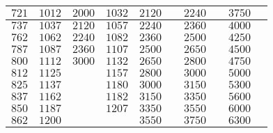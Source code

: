 \begin{table}[]
\begin{tabular}{|c|c|c|c|c|c|c|c|c|c|}
$721$       & $1012$       & $2000$      & $1032$      & $2120$      &           & $2240$            &                 & $3750$            &                 \\ \hline
$737$       & $1037$       & $2120$      & $1057$      & $2240$      &           & $2360$            &                 & $4000$            &                 \\ \hline
$762$       & $1062$       & $2240$      & $1082$      & $2360$      &           & $2500$            &                 & $4250$            &                 \\ \hline
$787$       & $1087$       & $2360$      & $1107$      & $2500$      &           & $2650$            &                 & $4500$            &                 \\ \hline
$800$       & $1112$       & $3000$      & $1132$      & $2650$      &           & $2800$            &                 & $4750$            &                 \\ \hline
$812$       & $1125$       &           & $1157$      & $2800$      &           & $3000$            &                 & $5000$            &                 \\ \hline
$825$       & $1137$       &           & $1180$      & $3000$      &           & $3150$            &                 & $5300$            &                 \\ \hline
$837$       & $1162$       &           & $1182$      & $3150$      &           & $3350$            &                 & $5600$            &                 \\ \hline
$850$       & $1187$       &           & $1207$      & $3350$      &           & $3550$            &                 & $6000$            &                 \\ \hline
$862$       & $1200$       &           &           & $3550$      &           & $3750$            &                 & $6300$            &                 \\ \hline
\end{tabular}
\end{table}